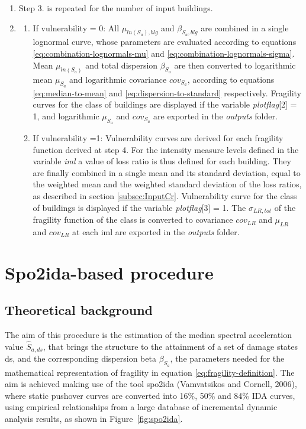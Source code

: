 \begin{enumerate}
\item Step 3. is repeated for the number of input buildings.

\item
\begin{enumerate}
\item If vulnerability = 0: All $\mu_{ln(S_a), blg}$ and $\beta_{S_a, blg}$ are combined in a single lognormal curve, whose parameters are evaluated according to equations \ref{eq:combination-lognormals-mu} and \ref{eq:combination-lognormals-sigma}. Mean $\mu_{ln(S_{a})}$ and total dispersion $\beta_{S_a}$ are then converted to logarithmic mean $\mu_{S_a}$ and logarithmic covariance $cov_{S_a}$, according to equations \ref{eq:median-to-mean} and \ref{eq:dispersion-to-standard} respectively. Fragility curves for the class of buildings are displayed if the variable \textit{plotflag}[2] = 1, and logarithmic $\mu_{S_a}$ and $cov_{S_a}$ are exported in the \textit{outputs} folder.

\item If vulnerability =1: Vulnerability curves are derived for each fragility function derived at step 4. For the intensity measure levels defined in the variable \textit{iml} a value of loss ratio is thus defined for each building. They are finally combined in a single mean and its standard deviation, equal to the weighted mean and the weighted standard deviation of the loss ratios, as described in section \ref{subsec:InputCr}. Vulnerability curve for the class of buildings is displayed if the variable \textit{plotflag}[3] = 1. The $\sigma_{LR, tot}$ of the fragility function of the class is converted to covariance $cov_{LR}$ and $\mu_{LR}$ and $cov_{LR}$ at each iml are exported in the \textit{outputs} folder.
\end{enumerate}
\end{enumerate}

\section{Spo2ida-based procedure}
\label{sec:spo2ida}
\subsection{Theoretical background}
The aim of this procedure is the estimation of the median spectral acceleration value $\hat{S}_{a,ds}$, that brings the structure to the attainment of a set of damage states ds, and the corresponding dispersion beta $\beta_{S_a}$, the parameters needed for the mathematical representation of fragility in equation \ref{eq:fragility-definition}. The aim is achieved making use of the tool spo2ida (Vamvatsikos and Cornell, 2006), where static pushover curves are converted into 16\%, 50\% and 84\% IDA curves, using empirical relationships from a large database of incremental dynamic analysis results, as shown in Figure~\ref{fig:spo2ida}.

